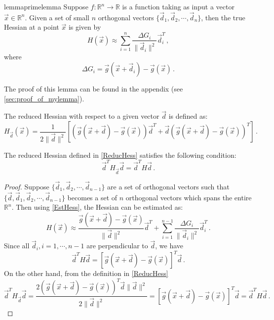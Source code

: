 \begin{restatable}{lemma}{primelemma} \label{Hess_Est_lem}
Suppose $f:\mathbb{R}^n \rightarrow  \mathbb{R}$ is a function taking as input a vector $\vec{x} \in \mathbb{R}^n$. Given a set of small $n$ orthogonal vectors $\{ \vec{d}_1, \vec{d}_2, \cdots, \vec{d}_n \}$, then the true Hessian at a point $\vec{x}$ is given by
\begin{equation} \label{EstHess}
 H(\vec{x}) \approx \sum_{i=1}^n \frac{\Delta G_i}{\| \vec{d}_i \|^2} \vec{d}_i^T \,,
\end{equation}  
where
$$ \Delta G_i = \vec{g}(\vec{x}+\vec{d}_i) - \vec{g}(\vec{x}) \,.$$
\end{restatable}

The proof of this lemma can be found in the appendix (see \cref{sec:proof_of_mylemma}).

\begin{definition}
The reduced Hessian with respect to a given vector $\vec{d}$ is defined as:
\begin{equation} \label{ReducHess}
 H_{\vec{d}} (\vec{x}) = \frac{1}{2 \| \vec{d} \|^2}\left[ (\vec{g}(\vec{x}+\vec{d}) - \vec{g}(\vec{x})) \vec{d}^T +  \vec{d} (\vec{g}(\vec{x}+\vec{d}) - \vec{g}(\vec{x}))^T\right]\,. 
\end{equation}
\end{definition}

\begin{theorem}
The reduced Hessian defined in \eqref{ReducHess} satisfies the following condition:
$$ \vec{d}^T H_{\vec{d}} \vec{d} = \vec{d}^T H \vec{d}\,. $$
\end{theorem}

\begin{proof}
Suppose $\{ \vec{d}_1, \vec{d}_2, \cdots, \vec{d}_{n-1} \}$ are a set of orthogonal vectors such that $\{ \vec{d}, \vec{d}_1, \vec{d}_2, \cdots, \vec{d}_{n-1} \}$ becomes a set of $n$ orthogonal vectors which spans the entire $\mathbb{R}^n$. Then using \eqref{EstHess}, the Hessian can be estimated as:
\begin{equation}
 H(\vec{x}) \approx \frac{\vec{g}(\vec{x}+\vec{d}) - \vec{g}(\vec{x})}{\| \vec{d} \|^2} \vec{d}^T + \sum_{i=1}^{n-1} \frac{\Delta G_i}{\| \vec{d}_i \|^2} \vec{d}_i^T \,.
\end{equation}  
Since all $\vec{d}_i, i=1, \cdots, n-1$ are perpendicular to $\vec{d}$, we have
$$ \vec{d}^T H \vec{d} = \left[ \vec{g}(\vec{x}+\vec{d}) - \vec{g}(\vec{x}) \right]^T \vec{d} \,.$$
On the other hand, from the definition in \eqref{ReducHess}
$$ \vec{d}^T H_{\vec{d}} \vec{d} = \frac{2 (\vec{g}(\vec{x}+\vec{d}) - \vec{g}(\vec{x}))^T \vec{d} \| \vec{d} \|^2}{2 \| \vec{d} \|^2} = \left[ \vec{g}(\vec{x}+\vec{d}) - \vec{g}(\vec{x}) \right]^T \vec{d} = \vec{d}^T H \vec{d} \,.$$

\end{proof}

